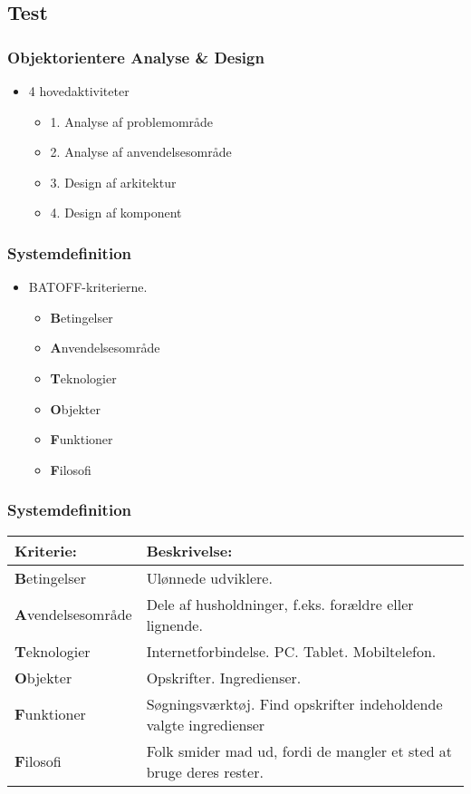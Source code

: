\subsection{Test}
	\begin{frame}
		\frametitle{Objektorientere Analyse \& Design}
		\begin{itemize}
			\item 4 hovedaktiviteter
			\begin{itemize}
				\item 1. Analyse af problemområde
				\item 2. Analyse af anvendelsesområde
				\item 3. Design af arkitektur
				\item 4. Design af komponent
			\end{itemize}
		\end{itemize}
	\end{frame}
	
	\begin{frame}
		\frametitle{Systemdefinition}
		\begin{itemize}
			\item  BATOFF-kriterierne.
				\begin{itemize}
				\item  \textbf{B}etingelser
				\item  \textbf{A}nvendelsesområde
				\item  \textbf{T}eknologier
				\item  \textbf{O}bjekter
				\item  \textbf{F}unktioner
				\item  \textbf{F}ilosofi
				\end{itemize}
		\end{itemize}
	\end{frame}
		
	\begin{frame}
		\frametitle{Systemdefinition}
		\begin{center}
    		\begin{tabular}{ | l | p{5cm} |} \hline
   				\textbf{Kriterie:} & \bf{Beskrivelse:} \\ \hline
    			\textbf{B}etingelser & Ulønnede udviklere. \\ \hline
    			\textbf{A}vendelsesområde & Dele af husholdninger, f.eks. forældre eller lignende. \\ \hline
    			\textbf{T}eknologier & Internetforbindelse. PC. Tablet. Mobiltelefon. \\ \hline
    			\textbf{O}bjekter & Opskrifter. Ingredienser. \\ \hline
    			\textbf{F}unktioner & Søgningsværktøj. Find opskrifter indeholdende valgte ingredienser \\ \hline
    			\textbf{F}ilosofi & Folk smider mad ud, fordi de mangler et sted at bruge deres rester. \\ \hline
    		\end{tabular}
		\end{center}
	\end{frame}